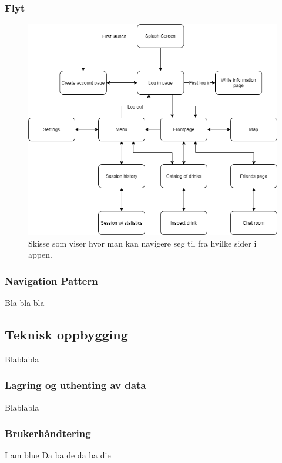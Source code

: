 \documentclass[12pt]{article}
\begin{document}
    \subsubsection{Flyt}

    \begin{figure}[H]
        \centering
        \includegraphics[scale=0.5]{images/lille_promille_float_diagram.drawio.png}
        \caption{Skisse som viser hvor man kan navigere seg til fra hvilke sider i appen.}
    \end{figure}

    \subsubsection{Navigation Pattern}
    Bla bla bla

\subsection{Teknisk oppbygging}
Blablabla

    \subsubsection{Lagring og uthenting av data}
    Blablabla

    \subsubsection{Brukerhåndtering}
    I am blue
    Da ba de da ba die
\end{document}
